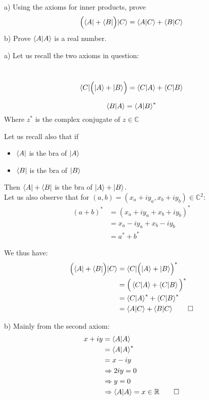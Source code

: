 \documentclass[solutions.tex]{subfiles}
\begin{document}
\maketitle
\begin{exercise}
a) Using the axioms for inner products, prove
$$ \Big( \langle A| + \langle B|\Big) |C\rangle = \left\langle A \middle| C \right\rangle + \left\langle B \middle| C \right\rangle $$
b) Prove $\left\langle A \middle| A \right\rangle$ is a real number.
\end{exercise}
\hrr

a) Let us recall the two axioms in question:
\begin{axiom}\ \\
$$ \langle C| \Big( |A\rangle + |B\rangle \Big) = \left\langle C \middle| A \right\rangle + \left\langle C \middle| B \right\rangle $$
\end{axiom}
\begin{axiom}
$$ \left\langle B \middle| A \right\rangle = \left\langle A \middle| B \right\rangle^{*} $$
Where $z^{*}$ is the complex conjugate of $z\in\mathbb{C}$
\end{axiom}

Let us recall also that if
\begin{itemize}
	\item $\langle A|$ is the bra of $|A\rangle$
	\item $\langle B|$ is the bra of $|B\rangle$
\end{itemize}
Then $\langle A|+\langle B|$ is the bra of $|A\rangle+|B\rangle$. \\

Let us also observe that for
$(a, b) = (x_a+iy_a, x_b+iy_b) \in\mathbb{C}^2$:
\begin{align*}
	(a+b)^* &= (x_a+iy_a+x_b+iy_b)^* \\
	~ &= x_a-iy_a+x_b-iy_b \\
	~ &= a^* + b^*
\end{align*}

We thus have:
\begin{align*}
	\Big( \langle A| + \langle B|\Big) |C\rangle &= \langle C|\Big( |A\rangle + |B\rangle\Big)^* \\
	~ &= \Big(\left\langle C \middle| A \right\rangle + \left\langle C \middle| B \right\rangle\Big)^* \\
	~ &= \left\langle C \middle| A \right\rangle^* + \left\langle C \middle| B \right\rangle^* \\
	~ &= \left\langle A \middle| C \right\rangle + \left\langle B \middle| C \right\rangle \qed
\end{align*}

b) Mainly from the second axiom:
\begin{align*}
	x+iy &= \left\langle A \middle| A \right\rangle \\
	~ &= \left\langle A \middle| A \right\rangle^* \\
	~ &= x-iy \\
	~ &\Rightarrow 2iy = 0 \\
	~ &\Rightarrow y = 0 \\
	~ &\Rightarrow \left\langle A \middle| A \right\rangle=x\in\mathbb{R}\qed
\end{align*}
\end{document}

